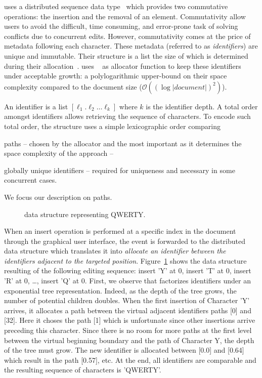 \CRATE uses a distributed sequence data type~\cite{shapiro2011conflict} which
provides two commutative operations: the insertion and the removal of an
element. Commutativity allow users to avoid the difficult, time consuming, and
error-prone task of solving conflicts due to concurrent edits. However,
commutativity comes at the price of metadata following each character. These
metadata (referred to as \emph{identifiers}) are unique and immutable. Their
structure is a list the size of which is determined during their
allocation~\cite{preguica2009commutative, weiss2009logoot}. \CRATE uses
\LSEQ~\cite{nedelec2013lseq} as allocator function to keep these identifiers
under acceptable growth: a polylogarithmic upper-bound on their space complexity
compared to the document size ($\mathcal{O}((\log |document|)^2)$).

An identifier is a list $[\ell_1.\ell_2\ldots\ell_k]$ where $k$ is the
identifier depth. A total order amongst identifiers allows retrieving the
sequence of characters. To encode such total order, the structure uses a simple
lexicographic order comparing
\begin{inparaenum}[(i)]
\item paths -- chosen by the allocator and the most important as it determines
  the space complexity of the approach --
\item globally unique identifiers -- required for uniqueness and necessary in
  some concurrent cases.
\end{inparaenum}
We focus our description on paths.

\begin{figure}
  \centering
  
  \caption{\label{fig:lseqexample}\LSEQ data structure representing QWERTY.}
\end{figure}

When an insert operation is performed at a specific index in the document
through the graphical user interface, the event is forwarded to the distributed
data structure which translates it into \emph{allocate an identifier between the
  identifiers adjacent to the targeted position}.  Figure~\ref{fig:lseqexample}
shows the data structure resulting of the following editing sequence: insert 'Y'
at 0, insert 'T' at 0, insert 'R' at 0, \ldots, insert 'Q' at 0. First, we
observe that \LSEQ factorizes identifiers under an exponential tree
representation. Indeed, as the depth of the tree grows, the number of potential
children doubles. When the first insertion of Character 'Y' arrives, it
allocates a path between the virtual adjacent identifiers paths [0] and
[32]. Here it choses the path [1] which is unfortunate since other insertions
arrive preceding this character. Since there is no room for more paths at the
first level between the virtual beginning boundary and the path of Character Y,
the depth of the tree must grow. The new identifier is allocated between [0.0]
and [0.64] which result in the path [0.57], etc. At the end, all identifiers are
comparable and the resulting sequence of characters is 'QWERTY'.

